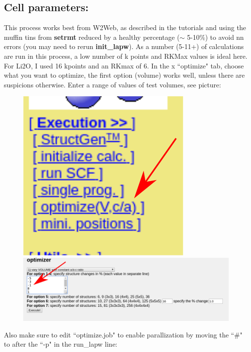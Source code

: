 \documentclass[12pt]{article}
\begin{document}
\subsection{Cell parameters:}
This process works best from W2Web, as described in the tutorials and using the muffin tins from \textbf{setrmt} reduced by a healthy percentage ($\sim$ 5-10\%) to avoid nn errors (you may need to rerun \textbf{init\_lapw}).    As  a number (5-11+) of calculations are run in this process, a low number of k points and RKMax values is ideal here. For Li2O, I used 16 kpoints and an RKmax of 6.   In the x ``optimize" tab, choose what you want to optimize, the first option (volume) works well, unless there are suspicions otherwise.  Enter a range of values of test volumes, see picture:

\begin{figure}[H]

\includegraphics[scale=0.3]{./images/vol_opt_menu.png}
~
\includegraphics[scale=0.3]{./images/vol_opt.png}



\end{figure}


Also make sure to edit ``optimize.job" to enable parallization by moving the ``\#" to after the ``-p" in the run\_lapw line: 
\end{document}
